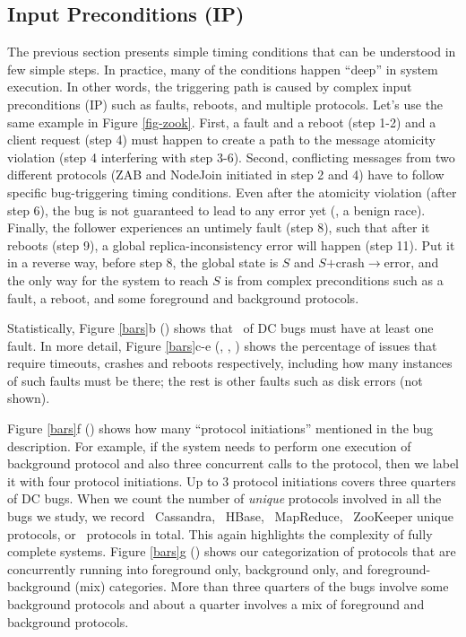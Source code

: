 



\subsection{Input Preconditions (IP)} 
\label{trig-input}


The previous section presents simple timing conditions that can be
understood in few simple steps.  In practice, many of the conditions
happen ``deep'' in system execution.  In other words, the triggering
path is caused by complex input preconditions (IP) such as faults, reboots,
and multiple protocols.  Let's use the same example in Figure
\ref{fig-zook}.
%
First, a fault and a reboot (step 1-2) and a client request (step 4)
must happen to create a path to the message atomicity violation (step
4 interfering with step 3-6).
%
Second, conflicting messages from two different protocols (ZAB and
NodeJoin initiated in step 2 and 4) have to follow specific
bug-triggering timing conditions.
%
Even after the atomicity violation (after step 6), the bug is not
guaranteed to lead to any error yet (\ie, a benign race).
%
Finally, the follower experiences an untimely fault (step 8), such
that after it reboots (step 9), a global replica-inconsistency error
will happen (step 11).
%
Put it in a reverse way, before step 8, the global state is $S$
and $S$$+$crash$\rightarrow$error, and the only way for the
system to reach $S$ is from complex preconditions such as a
fault, a reboot, and some foreground and background protocols.



Statistically, Figure \ref{bars}b (\BFLT) shows that \pctFaultYes\ of
DC bugs must have at least one fault.  In more detail, Figure
\ref{bars}c-e (\BTO, \BCR, \BRB) shows the percentage of issues that
require timeouts, crashes and reboots respectively, including how many
instances of such faults must be there; the rest is other faults such
as disk errors (not shown).


Figure \ref{bars}f (\BPROT) shows how many ``protocol initiations''
mentioned in the bug description.  For example, if the system needs to
perform one execution of background protocol and also three concurrent
calls to the  protocol, then we label it with four protocol
initiations.  Up to 3 protocol initiations covers three quarters of
DC bugs.
%
When we count the number of {\em unique} protocols involved in all the
bugs we study, we record \totProtCA\ Cassandra, \totProtHB\ HBase,
\totProtMR\ MapReduce, \totProtZK\ ZooKeeper unique protocols, or
\totProtAll\ protocols in total.  This again highlights the complexity
of fully complete systems.
%
Figure \ref{bars}g (\BBFG) shows our categorization of protocols that
are concurrently running into foreground only,
background only, and foreground-background (mix)
categories.  More than three quarters of the bugs involve some
background protocols and about a quarter involves a mix of foreground
and background protocols.

